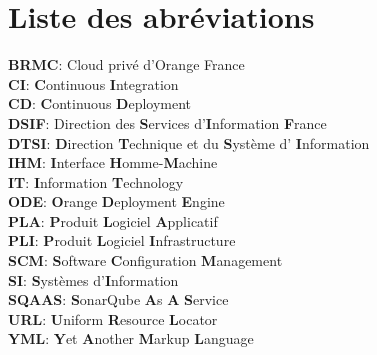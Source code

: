 \chapter*{Liste des abréviations}

\textbf{BRMC}: Cloud privé d’Orange France\\
    
\textbf{CI}:  \textbf{C}ontinuous \textbf{I}ntegration\\

\textbf{CD}:  \textbf{C}ontinuous \textbf{D}eployment\\

\textbf{DSIF}:  Direction des \textbf{S}ervices d’\textbf{I}nformation \textbf{F}rance\\
    
\textbf{DTSI}:  \textbf{D}irection \textbf{T}echnique et du \textbf{S}ystème d' \textbf{I}nformation\\

\textbf{IHM}: \textbf{I}nterface \textbf{H}omme-\textbf{M}achine \\
    
\textbf{IT}:  \textbf{I}nformation \textbf{T}echnology\\
    
\textbf{ODE}:  \textbf{O}range \textbf{D}eployment \textbf{E}ngine\\
    
\textbf{PLA}:  \textbf{P}roduit \textbf{L}ogiciel \textbf{A}pplicatif\\
    
\textbf{PLI}:  \textbf{P}roduit \textbf{L}ogiciel \textbf{I}nfrastructure\\
    
\textbf{SCM}:  \textbf{S}oftware \textbf{C}onfiguration \textbf{M}anagement\\
    
\textbf{SI}:  \textbf{S}ystèmes d’\textbf{I}nformation\\
    
\textbf{SQAAS}:  \textbf{S}onarQube \textbf{A}s \textbf{A} \textbf{S}ervice\\
    
\textbf{URL}:  \textbf{U}niform \textbf{R}esource \textbf{L}ocator\\
    
\textbf{YML}:  \textbf{Y}et \textbf{A}nother \textbf{M}arkup \textbf{L}anguage\\

